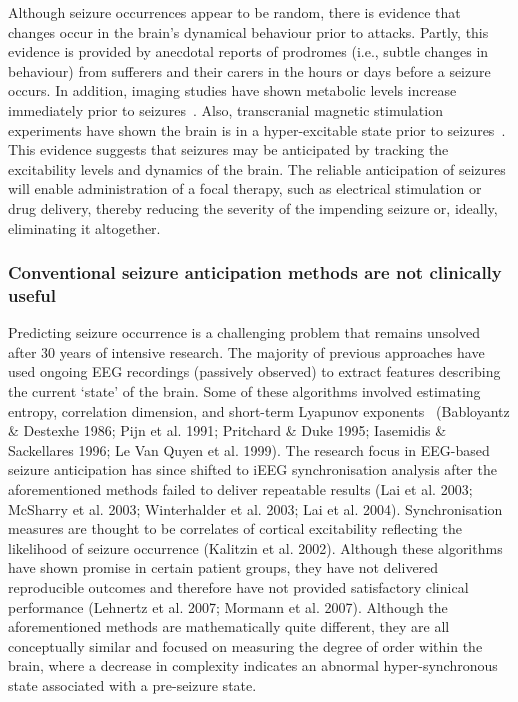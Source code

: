 \documentclass[]{article}
\begin{document}
Although seizure occurrences appear to be random, there is evidence that changes occur in the brain’s dynamical behaviour prior to attacks. Partly, this evidence is provided by anecdotal reports of prodromes (i.e., subtle changes in behaviour) from sufferers and their carers in the hours or days before a seizure occurs. In addition, imaging studies have shown metabolic levels increase immediately prior to seizures~\cite{Zhao2007}. Also, transcranial magnetic stimulation experiments have shown the brain is in a hyper-excitable state prior to seizures~\cite{Badawy2009,Wright2006}. This evidence suggests that seizures may be anticipated by tracking the excitability levels and dynamics of the brain. The reliable anticipation of seizures will enable administration of a focal therapy, such as electrical stimulation or drug delivery, thereby reducing the severity of the impending seizure or, ideally, eliminating it altogether. 

\subsubsection{Conventional seizure anticipation methods are not clinically useful}
Predicting seizure occurrence is a challenging problem that remains unsolved after 30 years of intensive research. The majority of previous approaches have used ongoing EEG recordings (passively observed) to extract features describing the current ‘state’ of the brain. Some of these algorithms involved estimating entropy, correlation dimension, and short-term Lyapunov exponents~\cite{Babloyantz1986} (Babloyantz \& Destexhe 1986; Pijn et al. 1991; Pritchard \& Duke 1995; Iasemidis \& Sackellares 1996; Le Van Quyen et al. 1999). 
The research focus in EEG-based seizure anticipation has since shifted to iEEG synchronisation analysis after the aforementioned methods failed to deliver repeatable results (Lai et al. 2003; McSharry et al. 2003; Winterhalder et al. 2003; Lai et al. 2004). Synchronisation measures are thought to be correlates of cortical excitability reflecting the likelihood of seizure occurrence (Kalitzin et al. 2002). Although these algorithms have shown promise in certain patient groups, they have not delivered reproducible outcomes and therefore have not provided satisfactory clinical performance (Lehnertz et al. 2007; Mormann et al. 2007). 
Although the aforementioned methods are mathematically quite different, they are all conceptually similar and focused on measuring the degree of order within the brain, where a decrease in complexity indicates an abnormal hyper-synchronous state associated with a pre-seizure state. 
\end{document}
